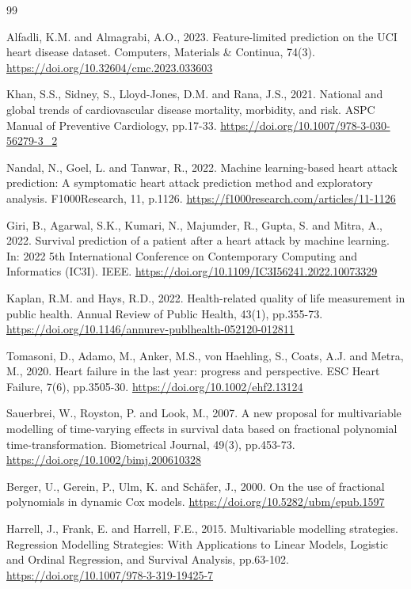 \documentclass[a4paper,12pt]{article}
\begin{document}
\begin{thebibliography}{99}


 Alfadli, K.M. and Almagrabi, A.O., 2023. Feature-limited prediction on the UCI heart disease dataset. Computers, Materials \& Continua, 74(3).
\url{https://doi.org/10.32604/cmc.2023.033603}

 Khan, S.S., Sidney, S., Lloyd-Jones, D.M. and Rana, J.S., 2021. National and global trends of cardiovascular disease mortality, morbidity, and risk. ASPC Manual of Preventive Cardiology, pp.17-33.
\url{https://doi.org/10.1007/978-3-030-56279-3_2}


 Nandal, N., Goel, L. and Tanwar, R., 2022. Machine learning-based heart attack prediction: A symptomatic heart attack prediction method and exploratory analysis. F1000Research, 11, p.1126.
\url{https://f1000research.com/articles/11-1126}


 Giri, B., Agarwal, S.K., Kumari, N., Majumder, R., Gupta, S. and Mitra, A., 2022. Survival prediction of a patient after a heart attack by machine learning. In: 2022 5th International Conference on Contemporary Computing and Informatics (IC3I). IEEE.
\url{https://doi.org/10.1109/IC3I56241.2022.10073329}


 Kaplan, R.M. and Hays, R.D., 2022. Health-related quality of life measurement in public health. Annual Review of Public Health, 43(1), pp.355-73.
\url{https://doi.org/10.1146/annurev-publhealth-052120-012811}

 Tomasoni, D., Adamo, M., Anker, M.S., von Haehling, S., Coats, A.J. and Metra, M., 2020. Heart failure in the last year: progress and perspective. ESC Heart Failure, 7(6), pp.3505-30.
\url{ https://doi.org/10.1002/ehf2.13124}


 Sauerbrei, W., Royston, P. and Look, M., 2007. A new proposal for multivariable modelling of time-varying effects in survival data based on fractional polynomial time-transformation. Biometrical Journal, 49(3), pp.453-73.
\url{ https://doi.org/10.1002/bimj.200610328}

 Berger, U., Gerein, P., Ulm, K. and Schäfer, J., 2000. On the use of fractional polynomials in dynamic Cox models.
\url{https://doi.org/10.5282/ubm/epub.1597}


 Harrell, J., Frank, E. and Harrell, F.E., 2015. Multivariable modelling strategies. Regression Modelling Strategies: With Applications to Linear Models, Logistic and Ordinal Regression, and Survival Analysis, pp.63-102.
\url{https://doi.org/10.1007/978-3-319-19425-7}



\end{thebibliography}
\end{document}
